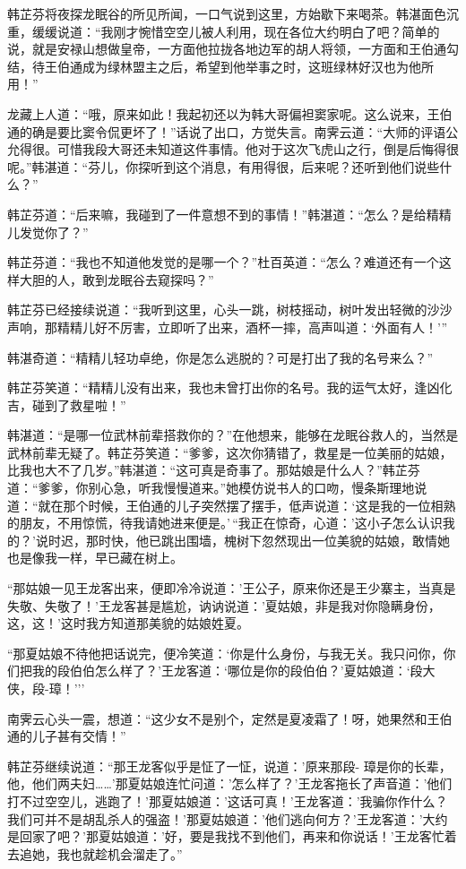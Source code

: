 \documentclass[12pt,oneside]{book}
\begin{document}
韩芷芬将夜探龙眠谷的所见所闻，一口气说到这里，方始歇下来喝茶。韩湛面色沉重，缓缓说道：``我刚才惋惜空空儿被人利用，现在各位大约明白了吧？简单的说，就是安禄山想做皇帝，一方面他拉拢各地边军的胡人将领，一方面和王伯通勾结，待王伯通成为绿林盟主之后，希望到他举事之时，这班绿林好汉也为他所用！''

龙藏上人道：``哦，原来如此！我起初还以为韩大哥偏袒窦家呢。这么说来，王伯通的确是要比窦令侃更坏了！''话说了出口，方觉失言。南霁云道：``大师的评语公允得很。可惜我段大哥还未知道这件事情。他对于这次飞虎山之行，倒是后悔得很呢。''韩湛道：``芬儿，你探听到这个消息，有用得很，后来呢？还听到他们说些什么？''

韩芷芬道：``后来嘛，我碰到了一件意想不到的事情！''韩湛道：``怎么？是给精精儿发觉你了？''

韩芷芬道：``我也不知道他发觉的是哪一个？''杜百英道：``怎么？难道还有一个这样大胆的人，敢到龙眠谷去窥探吗？''

韩芷芬已经接续说道：``我听到这里，心头一跳，树枝摇动，树叶发出轻微的沙沙声响，那精精儿好不厉害，立即听了出来，酒杯一摔，高声叫道：`外面有人！'''

韩湛奇道：``精精儿轻功卓绝，你是怎么逃脱的？可是打出了我的名号来么？''

韩芷芬笑道：``精精儿没有出来，我也未曾打出你的名号。我的运气太好，逢凶化吉，碰到了救星啦！''

韩湛道：``是哪一位武林前辈搭救你的？''在他想来，能够在龙眠谷救人的，当然是武林前辈无疑了。韩芷芬笑道：``爹爹，这次你猜错了，救星是一位美丽的姑娘，比我也大不了几岁。''韩湛道：``这可真是奇事了。那姑娘是什么人？''韩芷芬道：``爹爹，你别心急，听我慢慢道来。''她模仿说书人的口吻，慢条斯理地说道：``就在那个时候，王伯通的儿子突然摆了摆手，低声说道：`这是我的一位相熟的朋友，不用惊慌，待我请她进来便是。'\,``我正在惊奇，心道：'这小子怎么认识我的？'说时迟，那时快，他已跳出围墙，槐树下忽然现出一位美貌的姑娘，敢情她也是像我一样，早已藏在树上。

``那姑娘一见王龙客出来，便即冷冷说道：'王公子，原来你还是王少寨主，当真是失敬、失敬了！'王龙客甚是尴尬，讷讷说道：'夏姑娘，非是我对你隐瞒身份，这，这！'这时我方知道那美貌的姑娘姓夏。

``那夏姑娘不待他把话说完，便冷笑道：`你是什么身份，与我无关。我只问你，你们把我的段伯伯怎么样了？'王龙客道：`哪位是你的段伯伯？'夏姑娘道：`段大侠，段-璋！'''

南霁云心头一震，想道：``这少女不是别个，定然是夏凌霜了！呀，她果然和王伯通的儿子甚有交情！''

韩芷芬继续说道：``那王龙客似乎是怔了一怔，说道：'原来那段-
璋是你的长辈，他，他们两夫妇\ldots\ldots'那夏姑娘连忙问道：'怎么样了？'王龙客拖长了声音道：'他们打不过空空儿，逃跑了！'那夏姑娘道：'这话可真！'王龙客道：'我骗你作什么？我们可并不是胡乱杀人的强盗！'那夏姑娘道：'他们逃向何方？'王龙客道：'大约是回家了吧？'那夏姑娘道：'好，要是我找不到他们，再来和你说话！'王龙客忙着去追她，我也就趁机会溜走了。''
\end{document}
